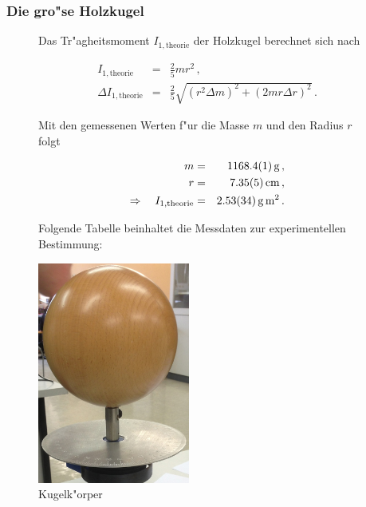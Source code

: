 			\subsubsection{Die gro"se Holzkugel}
			\label{subsubsec:holzkugel}
				\begin{figure}[htbp]
					
					\begin{minipage}[t]{8cm}
						\vspace{0pt}
						Das Tr"agheitsmoment $I_\mathrm{1, theorie}$ der Holzkugel berechnet sich nach

						\begin{eqnarray*}
							I_\mathrm{1, theorie} & = & \frac{2}{5}mr^2 \,, \\
							\Delta I_\mathrm{1, theorie} & = & \frac{2}{5} \sqrt{ \left(r^2 \Delta m\right)^2 + \left( 2 mr \Delta r\right)^2} \,.
						\end{eqnarray*}

						Mit den gemessenen Werten f"ur die Masse $m$ und den Radius $r$ folgt

						\begin{eqnarray*}
							m & = & \SI{1168.4 (1)}{\gram} \,, \\
							r & = & \SI{7.35 (5)}{\centi \meter} \,, \\
							\Rightarrow \quad I_\mathrm{1, theorie} & = & \SI{2.53 (34)}{\gram \meter \squared} \,.
						\end{eqnarray*}

						Folgende Tabelle beinhaltet die Messdaten zur experimentellen Bestimmung:
					\end{minipage}
					\hfill
					\begin{minipage}[t]{5cm}
						\vspace{0pt}
						\centering
						\includegraphics[width = 5cm]{img/kugel.jpg}
						\caption{Kugelk"orper}
						\label{fig:kugel}
					\end{minipage}
				\end{figure}


